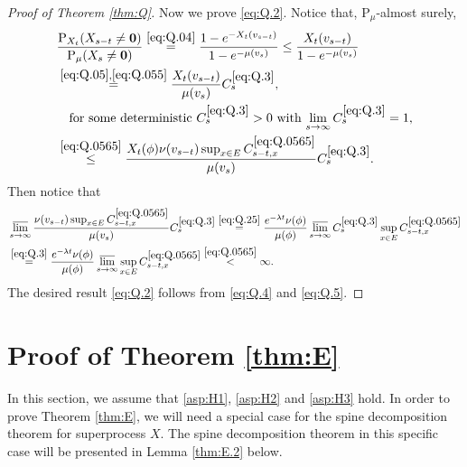 \documentclass[12pt,a4paper]{amsart}
\numberwithin{equation}{section}
\theoremstyle{plain}
\theoremstyle{definition}
\theoremstyle{remark}
\begin{document}
\begin{proof}[Proof of Theorem \ref{thm:Q}]
	Now we prove \eqref{eq:Q.2}.
	Notice that, $\mathrm P_\mu$-almost surely,
\begin{align}
	& \frac{\mathrm P_{X_t}(X_{s-t}\neq \mathbf 0)}{\mathrm P_\mu(X_s\neq \mathbf 0)}
	\overset{\eqref{eq:Q.04}}= \frac{1-e^{- X_t(v_{s-t}) }}{1-e^{- \mu(v_s) }}
	\leq \frac{X_t(v_{s-t}) }{1-e^{- \mu(v_s) }}
	\\\label{eq:Q.3}&\overset{\eqref{eq:Q.05},\eqref{eq:Q.055}}= \frac{X_t(v_{s-t}) }{ \mu(v_s)} C_s^{\eqref{eq:Q.3}},
	\\& \quad \text{for some deterministic $C_s^{\eqref{eq:Q.3}}>0$ with $\lim_{s\to \infty} C_s^{\eqref{eq:Q.3}} = 1$,}
	\\\label{eq:Q.4}&\overset{\eqref{eq:Q.0565}}\leq \frac{X_t(\phi) \nu(v_{s-t}) \sup_{x\in E} C_{s-t,x}^{\eqref{eq:Q.0565}}}{ \mu(v_s)} C_s^{\eqref{eq:Q.3}}.
\end{align}
	Then notice that
\begin{align}
&  \varlimsup_{s\to \infty}\frac{\nu(v_{s-t}) \sup_{x\in E} C_{s-t,x}^{\eqref{eq:Q.0565}}}{ \mu(v_s)} C_s^{\eqref{eq:Q.3}}
	\overset{\eqref{eq:Q.25}} = \frac{e^{-\lambda t} \nu(\phi)}{\mu(\phi)} \varlimsup_{s\to \infty}C_s^{\eqref{eq:Q.3}} \sup_{x\in E}C_{s-t,x}^{\eqref{eq:Q.0565}}
	\\\label{eq:Q.5}&\overset{\eqref{eq:Q.3}} = \frac{e^{-\lambda t} \nu(\phi)}{\mu(\phi)} \varlimsup_{s\to \infty} \sup_{x\in E}C_{s-t,x}^{\eqref{eq:Q.0565}}
	\overset{\eqref{eq:Q.0565}}< \infty.
\end{align}
	The desired result \eqref{eq:Q.2}  follows from \eqref{eq:Q.4} and \eqref{eq:Q.5}.
\end{proof}

	\section{Proof of Theorem \ref{thm:E}} \label{sec:E}
	In this section, we assume that \eqref{asp:H1}, \eqref{asp:H2} and \eqref{asp:H3} hold.
	In order to prove Theorem \ref{thm:E}, we will need a special case for the spine decomposition theorem for superprocess $X$.
	The spine decomposition theorem in this specific case will be presented in Lemma \ref{thm:E.2} below.
	
\end{document}
